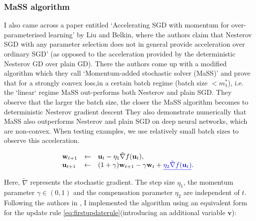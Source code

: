 \documentclass{article}
\begin{document}
\subsubsection{MaSS algorithm}

 I also came across a paper entitled ‘Accelerating SGD with momentum for over-parameterised learning’ by Liu and Belkin, where the authors claim that Nesterov SGD with any parameter selection does not in general provide acceleration over ordinary SGD’ (as opposed to the acceleration provided by the deterministic Nesterov GD over plain GD). There the authors come up with a modified algorithm which they call ‘Momentum-added stochastic solver (MaSS)’ and prove that for a strongly convex loss,in a certain batch regime (batch size $ <m_{1}^{*}$), i.e. the `linear` regime MaSS out-performs both Nesterov and plain SGD. They observe that the larger the batch size, the closer the MaSS algorithm becomes to deterministic Nesterov gradient descent  They also demonstrate numerically that MaSS also outperforms Nesterov and plain SGD on deep neural networks, which are non-convex. When testing examples, we use relatively small batch sizes to observe this acceleration.

 \begin{eqnarray}\left.\begin{array}{lll}
\mathbf{w}_{t+1} &\leftarrow& \mathbf{u}_t - \eta_1 \tilde{\nabla}f(\mathbf{u}_t), \\
\mathbf{u}_{t+1} &\leftarrow& (1+\gamma)\mathbf{w}_{t+1} - \gamma \mathbf{w}_{t} + \underline{\color{blue}  \eta_2 \tilde{\nabla}f(\mathbf{u}_t)}.\end{array}\right.\label{eq:firstupdaterule}
\end{eqnarray}

Here, $\tilde{\nabla}$ represents the stochastic gradient. The step size $\eta_1$, the  momentum parameter $\gamma \in (0,1)$ and the compensation parameter $\eta_2$ are independent of $t$. Following the authors in \cite{liu2019acceleratingsgdmomentumoverparameterized}, I implemented the algorithm using an equivalent form for the update rule \ref{eq:firstupdaterule}(introducing an additional variable $\mathbf{v}$):
\end{document}

